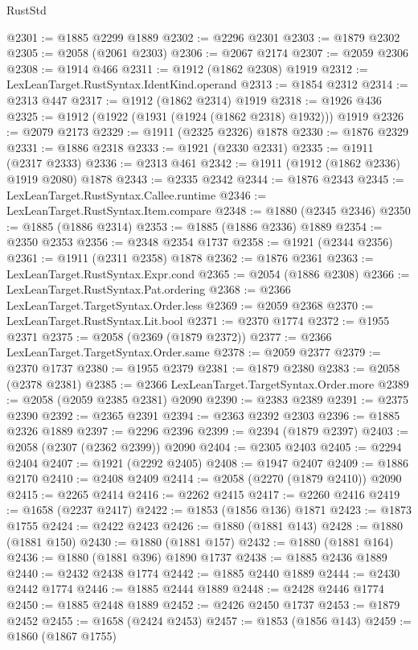 \begin{lexlean}{RustStd}
\begin{coremodule}
@2301 := @1885 @2299 @1889
@2302 := @2296 @2301
@2303 := @1879 @2302
@2305 := @2058 (@2061 @2303)
@2306 := @2067 @2174
@2307 := @2059 @2306
@2308 := @1914 @466
@2311 := @1912 (@1862 @2308) @1919
@2312 := LexLeanTarget.RustSyntax.IdentKind.operand
@2313 := @1854 @2312
@2314 := @2313 @447
@2317 := @1912 (@1862 @2314) @1919
@2318 := @1926 @436
@2325 := @1912 (@1922 (@1931 (@1924 (@1862 @2318) @1932))) @1919
@2326 := @2079 @2173
@2329 := @1911 (@2325 @2326) @1878
@2330 := @1876 @2329
@2331 := @1886 @2318
@2333 := @1921 (@2330 @2331)
@2335 := @1911 (@2317 @2333)
@2336 := @2313 @461
@2342 := @1911 (@1912 (@1862 @2336) @1919 @2080) @1878
@2343 := @2335 @2342
@2344 := @1876 @2343
@2345 := LexLeanTarget.RustSyntax.Callee.runtime
@2346 := LexLeanTarget.RustSyntax.Item.compare
@2348 := @1880 (@2345 @2346)
@2350 := @1885 (@1886 @2314)
@2353 := @1885 (@1886 @2336) @1889
@2354 := @2350 @2353
@2356 := @2348 @2354 @1737
@2358 := @1921 (@2344 @2356)
@2361 := @1911 (@2311 @2358) @1878
@2362 := @1876 @2361
@2363 := LexLeanTarget.RustSyntax.Expr.cond
@2365 := @2054 (@1886 @2308)
@2366 := LexLeanTarget.RustSyntax.Pat.ordering
@2368 := @2366 LexLeanTarget.TargetSyntax.Order.less
@2369 := @2059 @2368
@2370 := LexLeanTarget.RustSyntax.Lit.bool
@2371 := @2370 @1774
@2372 := @1955 @2371
@2375 := @2058 (@2369 (@1879 @2372))
@2377 := @2366 LexLeanTarget.TargetSyntax.Order.same
@2378 := @2059 @2377
@2379 := @2370 @1737
@2380 := @1955 @2379
@2381 := @1879 @2380
@2383 := @2058 (@2378 @2381)
@2385 := @2366 LexLeanTarget.TargetSyntax.Order.more
@2389 := @2058 (@2059 @2385 @2381) @2090
@2390 := @2383 @2389
@2391 := @2375 @2390
@2392 := @2365 @2391
@2394 := @2363 @2392 @2303
@2396 := @1885 @2326 @1889
@2397 := @2296 @2396
@2399 := @2394 (@1879 @2397)
@2403 := @2058 (@2307 (@2362 @2399)) @2090
@2404 := @2305 @2403
@2405 := @2294 @2404
@2407 := @1921 (@2292 @2405)
@2408 := @1947 @2407
@2409 := @1886 @2170
@2410 := @2408 @2409
@2414 := @2058 (@2270 (@1879 @2410)) @2090
@2415 := @2265 @2414
@2416 := @2262 @2415
@2417 := @2260 @2416
@2419 := @1658 (@2237 @2417)
@2422 := @1853 (@1856 @136) @1871
@2423 := @1873 @1755
@2424 := @2422 @2423
@2426 := @1880 (@1881 @143)
@2428 := @1880 (@1881 @150)
@2430 := @1880 (@1881 @157)
@2432 := @1880 (@1881 @164)
@2436 := @1880 (@1881 @396) @1890 @1737
@2438 := @1885 @2436 @1889
@2440 := @2432 @2438 @1774
@2442 := @1885 @2440 @1889
@2444 := @2430 @2442 @1774
@2446 := @1885 @2444 @1889
@2448 := @2428 @2446 @1774
@2450 := @1885 @2448 @1889
@2452 := @2426 @2450 @1737
@2453 := @1879 @2452
@2455 := @1658 (@2424 @2453)
@2457 := @1853 (@1856 @143)
@2459 := @1860 (@1867 @1755)

\end{coremodule}
\end{lexlean}
